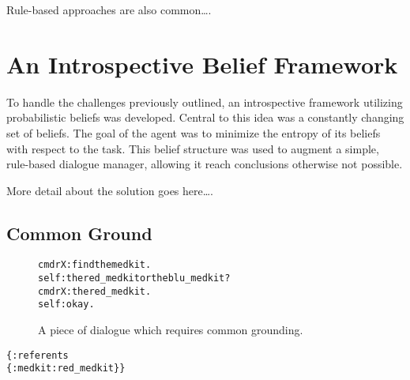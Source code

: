 \documentclass[12pt]{article}
\begin{document}
Rule-based approaches are also common\dots.

\section{An Introspective Belief Framework}
\label{sec:framework}

To handle the challenges previously outlined, an introspective
framework utilizing probabilistic beliefs was developed. Central to
this idea was a constantly changing set of beliefs. The goal of the
agent was to minimize the entropy of its beliefs with respect to the
task. This belief structure was used to augment a simple, rule-based
dialogue manager, allowing it reach conclusions otherwise not
possible.

More detail about the solution goes here\dots.



\subsection{Common Ground}

\begin{wrapfigure}{r}{0.7\textwidth}
  \label{fig:cg_text}
  \caption{A piece of dialogue which requires common grounding.}
  \begin{alltt}
    cmdrX: find the medkit.
    self:  the red_medkit or the blu_medkit?
    cmdrX: the red_medkit.
    self:  okay.
  \end{alltt}
\end{wrapfigure}



\begin{alltt}
\{:referents
 \{:medkit :red_medkit\}\}
\end{alltt}
\end{document}
